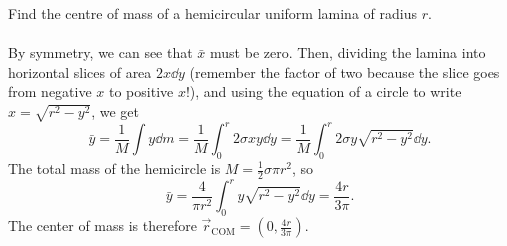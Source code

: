 \documentclass[../classical_mechanics.tex]{subfiles}
\begin{document}
        \begin{example}
            Find the centre of mass of a hemicircular uniform lamina of radius $r$.
            \begin{figure}[H]
                \centering
            \end{figure}

            \paragraph{}
            By symmetry, we can see that $\bar{x}$ must be zero.
            Then, dividing the lamina into horizontal slices of area $2x\dd{y}$ (remember the factor of two because the slice goes from negative $x$ to positive $x$!), and using the equation of a circle to write $x=\sqrt{r^2-y^2}$, we get
            \begin{equation}
                \bar{y}=\frac{1}{M}\int y\dd{m}=\frac{1}{M}\int_0^r2\sigma xy\dd{y}=\frac{1}{M}\int_0^r2\sigma y\sqrt{r^2-y^2}\dd{y}.
            \end{equation}
            The total mass of the hemicircle is $M=\frac{1}{2}\sigma\pi r^2$, so
            \begin{equation}
                \bar{y}=\frac{4}{\pi r^2}\int_0^ry\sqrt{r^2-y^2}\dd{y}=\frac{4r}{3\pi}.
            \end{equation}
            The center of mass is therefore $\vec{r}_\text{COM}=\left(0,\frac{4r}{3\pi}\right)$.
        \end{example}
\end{document}
